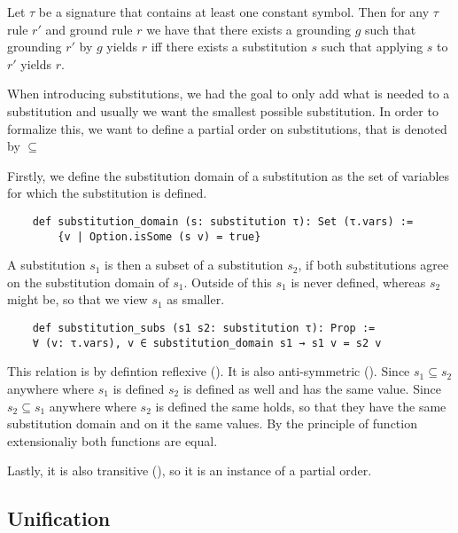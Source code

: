     \begin{theorem}[\groundingSubstitutionEquivalence]\label{trm:groundingSubstitutionEquivalence}
        Let $\tau$ be a signature that contains at least one constant symbol. Then for any $\tau$ rule $r'$ and ground rule $r$ we have that there exists a grounding $g$ such that grounding $r'$ by $g$ yields $r$ iff there exists a substitution $s$ such that applying $s$ to $r'$ yields $r$.
    \end{theorem}

    When introducing substitutions, we had the goal to only add what is needed to a substitution and usually we want the smallest possible substitution. In order to formalize this, we want to define a partial order on substitutions, that is denoted by $\subseteq$

    Firstly, we define the substitution domain of a substitution as the set of variables for which the substitution is defined. 

    \begin{lstlisting}
    def substitution_domain (s: substitution τ): Set (τ.vars) := 
        {v | Option.isSome (s v) = true}
    \end{lstlisting}

    A substitution $s_1$ is then a subset of a substitution $s_2$, if both substitutions agree on the substitution domain of $s_1$. Outside of this $s_1$ is never defined, whereas $s_2$ might be, so that we view $s_1$ as smaller.

    \begin{lstlisting}
    def substitution_subs (s1 s2: substitution τ): Prop :=
    ∀ (v: τ.vars), v ∈ substitution_domain s1 → s1 v = s2 v
    \end{lstlisting}

    This relation is by defintion reflexive (\substitutionsubsrefl). It is also anti-symmetric (\substitutionsubsantisymm). Since $s_1 \subseteq s_2$ anywhere where $s_1$ is defined $s_2$ is defined as well and has the same value. Since $s_2 \subseteq s_1$ anywhere where $s_2$ is defined the same holds, so that they have the same substitution domain and on it the same values. By the principle of function extensionaliy both functions are equal.

    Lastly, it is also transitive (\substitutionsubstrans), so it is an instance of a partial order.

\subsection{Unification}

